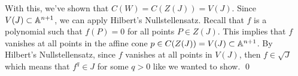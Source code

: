 With this, we've shown that $C(W) = C(Z(J)) = V(J)$. Since $V(J) \subset \mathbb{A}^{n+1}$, we can apply Hilbert's Nullstellensatz. Recall that $f$ is a polynomial such that $f(P) = 0$ for all points $P \in Z(J)$. This implies that $f$ vanishes at all points in the affine cone $p \in C(Z(J)) = V(J) \subset \mathbb{A}^{n+1}$. By Hilbert's Nullstellensatz, since $f$ vanishes at all points in $V(J)$, then $f \in \sqrt{J}$ which means that $f^q \in J$ for some $q > 0$ like we wanted to show. \qed
